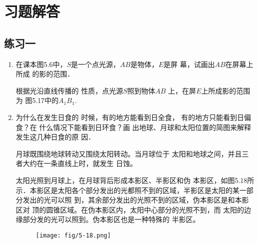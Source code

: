 \section{习题解答}


\subsection{练习一}
\begin{enumerate}
    \item 在课本图5.6中，$S$是一个点光源，$AB$是物体，$E$是屏
幕，试画出$AB$在屏幕上所成
的影的范围．
\begin{figure}[htp]
	\centering
{}
	\caption{}
\end{figure}


\begin{solution}
    根据光沿直线传播的
    性质，点光源$S$照到物体$AB$
    上，在屏$E$上所成影的范围为
    图5.17中的$A_1B_1$.
\end{solution}


\item 为什么在发生日食的
时候，有的地方能看到日全食，
有的地方只能看到日偏食？在
什么情况下能看到日环食？画
出地球、月球和太阳位置的简图来解释发生这几种日食的原
因．

\begin{solution}
    月球既围绕地球转动又围绕太阳转动。当月球位于
    太阳和地球之间，并且三者大约在一条直线上时，就发生
    日蚀。

    
    太阳光照到月球上，在月球背后形成本影区、半影区和伪
    本影区，如图5.18所示．本影区是太阳各个部分发出的光都照不到的区域，半影区是太阳的某一部分发出的光可以照
    到，其余部分发出的光照不到的区域，伪本影区是和本影区对
    顶的圆锥区域。在伪本影区内，太阳中心部分的光照不到，而
    太阳的边缘部分发的光可以照到。伪本影区也是一种特殊的
    半影区。    

    \begin{figure}[htp]
        \centering
        \texttt{[image: fig/5-18.png]}
        \caption{}
    \end{figure}


\end{solution}
\end{enumerate}
